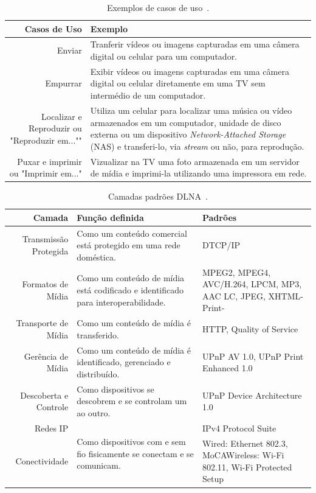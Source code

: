 \begin{table}
	\begin{center}
		\begin{tabular}{rl}
		\hline
		\textbf{Casos de Uso} & \textbf{Exemplo}																\\
		\hline
		Enviar & Tranferir vídeos ou imagens capturadas em uma câmera digital ou celular para um computador.	\\
		\hline
		Empurrar & Exibir vídeos ou imagens capturadas em uma câmera digital ou celular diretamente em uma TV sem intermédio de um computador. \\
		\hline
		Localizar e Reproduzir ou "Reproduzir em..."" & Utiliza um celular para localizar uma música ou vídeo armazenados em um computador, unidade de disco externa ou um dispositivo \emph{Network-Attached Storage} (NAS) e transferi-lo, via \emph{stream} ou não, para reprodução. \\
		\hline
		Puxar e imprimir ou "Imprimir em..." & Vizualizar na TV uma foto armazenada em um servidor de mídia e imprimi-la utilizando uma impressora em rede. \\
		\hline
		\end{tabular}
	\end{center}
	\caption{Exemplos de casos de uso~\cite{dlnahdvideostreaming}.}
	\label{tab:casosdeuso_dlna}
\end{table}

\begin{table}
	\begin{center}
		\begin{tabular}{rll}
		\hline
		\textbf{Camada} & \textbf{Função definida} & \textbf{Padrões}				\\
		\hline
		Transmissão Protegida & Como um conteúdo comercial está protegido em uma rede doméstica. & DTCP/IP \\
		\hline
		Formatos de Mídia & Como um conteúdo de mídia está codificado e identificado para interoperabilidade. & MPEG2, MPEG4, AVC/H.264, LPCM, MP3, AAC LC, JPEG, XHTML-Print- \\
		\hline
		Transporte de Mídia & Como um conteúdo de mídia é transferido. & HTTP, Quality of Service \\
		\hline
		Gerência de Mídia & Como um conteúdo de mídia é identificado, gerenciado e distribuído. & UPnP AV 1.0, UPnP Print Enhanced 1.0 \\
		\hline
		Descoberta e Controle & Como dispositivos se descobrem e se controlam um ao outro. & UPnP Device Architecture 1.0 \\
		\hline
		Redes IP & \multirow{2}{*}{Como dispositivos com e sem fio fisicamente se conectam e se comunicam.} & IPv4 Protocol Suite \\
		Conectividade & & Wired: Ethernet 802.3, MoCAWireless: Wi-Fi 802.11, Wi-Fi Protected Setup \\
		\hline
		\end{tabular}
	\end{center}
	\caption{Camadas padrões DLNA~\cite{dlnahdvideostreaming}.}
	\label{tab:camadaspadroes_dlna}
\end{table}